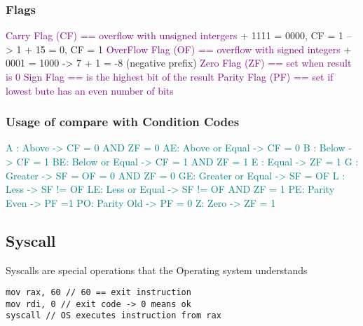 \documentclass[main.tex,fontsize=8pt,paper=a4,paper=landscape,DIV=calc,]{scrartcl}
\begin{document}
\begin{multicols*}{4}
\subsubsection{Flags}
\textcolor{purple}{Carry Flag (CF) == overflow with unsigned intergers} + 1111 = 0000, CF = 1 --> 1 + 15 = 0, CF = 1
\textcolor{purple}{OverFlow Flag (OF) == overflow with signed integers} + 0001 = 1000 -> 7 + 1 = -8 (negative prefix)
\textcolor{purple}{Zero Flag (ZF) == set when result is 0}
\textcolor{purple}{Sign Flag == is the highest bit of the result}
\textcolor{purple}{Parity Flag (PF) == set if lowest bute has an even number of bits}

\subsubsection{Usage of compare with Condition Codes}
\textcolor{teal}{A : Above } \textcolor{teal}{ -> CF = 0 AND ZF = 0}\newline
\textcolor{teal}{AE: Above or Equal } \textcolor{teal}{ -> CF = 0}\newline
\textcolor{teal}{B : Below } \textcolor{teal}{ -> CF = 1}\newline
\textcolor{teal}{BE: Below or Equal } \textcolor{teal}{ -> CF = 1 AND ZF = 1}\newline
\textcolor{teal}{E : Equal } \textcolor{teal}{ -> ZF = 1}\newline
\textcolor{teal}{G : Greater } \textcolor{teal}{ -> SF = OF = 0 AND ZF = 0}\newline
\textcolor{teal}{GE: Greater or Equal } \textcolor{teal}{ -> SF = OF}\newline
\textcolor{teal}{L : Less } \textcolor{teal}{ -> SF != OF}\newline
\textcolor{teal}{LE: Less or Equal } \textcolor{teal}{ -> SF != OF AND ZF = 1}\newline
\textcolor{teal}{PE: Parity Even}  \textcolor{teal}{ -> PF =1}\newline
\textcolor{teal}{PO: Parity Old } \textcolor{teal}{ -> PF = 0}\newline
\textcolor{teal}{Z:  Zero} \textcolor{teal}{ -> ZF = 1}

\subsection{Syscall}
Syscalls are special operations that the Operating system understands
\begin{lstlisting}
mov rax, 60 // 60 == exit instruction
mov rdi, 0 // exit code -> 0 means ok
syscall // OS executes instruction from rax
\end{lstlisting}
\vspace{2mm}




\end{multicols*}
\end{document}
